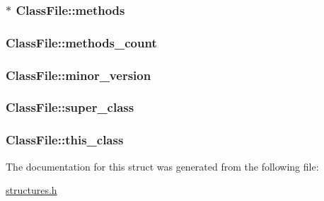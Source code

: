 \subsubsection[{\texorpdfstring{methods}{methods}}]{$\ast$ Class\+File\+::methods}\hypertarget{structClassFile_ad061f06cd709d10dbfbf82f443e43632}{}\label{structClassFile_ad061f06cd709d10dbfbf82f443e43632}
\subsubsection[{\texorpdfstring{methods\+\_\+count}{methods_count}}]{ Class\+File\+::methods\+\_\+count}\hypertarget{structClassFile_aacfb45d4af64216324b1ae5269c870d5}{}\label{structClassFile_aacfb45d4af64216324b1ae5269c870d5}
\subsubsection[{\texorpdfstring{minor\+\_\+version}{minor_version}}]{ Class\+File\+::minor\+\_\+version}\hypertarget{structClassFile_af0db7b0ea01cb9cea2cee177ca81df09}{}\label{structClassFile_af0db7b0ea01cb9cea2cee177ca81df09}
\subsubsection[{\texorpdfstring{super\+\_\+class}{super_class}}]{ Class\+File\+::super\+\_\+class}\hypertarget{structClassFile_a5f6c11c0ccb02fd992b5c102725253ec}{}\label{structClassFile_a5f6c11c0ccb02fd992b5c102725253ec}
\subsubsection[{\texorpdfstring{this\+\_\+class}{this_class}}]{ Class\+File\+::this\+\_\+class}\hypertarget{structClassFile_a2d33db0a560a71b94bc572dd1e4ec03a}{}\label{structClassFile_a2d33db0a560a71b94bc572dd1e4ec03a}


The documentation for this struct was generated from the following file\+:\begin{DoxyCompactItemize}
\item 
\hyperlink{structures_8h}{structures.\+h}\end{DoxyCompactItemize}
